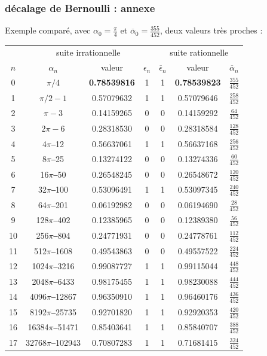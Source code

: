 \documentclass{beamer}
\begin{document}
\begin{frame}
\frametitle{décalage de Bernoulli : annexe}
Exemple comparé, avec  $\alpha_0 = \frac{\pi}{4}$   et   $\overline{\alpha}_0 = \frac{355}{452}$, deux valeurs très proches :
\begin{tabular}{|*{7}{c|}}
\
& \multicolumn{3}{|c|}{suite irrationnelle} 
& \multicolumn{3}{|c|}{suite rationnelle} \\
$n$ & $\alpha_n$ & valeur & $\epsilon_n$ & $\overline{\epsilon}_n$ & valeur & $\overline{\alpha}_n$ \\ 
\hline
0 & $\pi/4$ & \textbf{0.78539816} & 1 & 1 & \textbf{0.78539823} & $\frac{355}{452}$ \\
1 & $\pi/2-1$ & 0.57079632 & 1 & 1 & 0.57079646 & $\frac{258}{452}$ \\
2 & $\pi-3$ & 0.14159265 & 0 & 0 & 0.14159292 & $\frac{64}{452}$ \\
3 & $2\pi-6$ & 0.28318530 & 0 & 0 & 0.28318584 & $\frac{128}{452}$ \\
4 & 4$\pi$‒12 & 0.56637061 & 1 & 1 & 0.56637168 & $\frac{256}{452}$ \\
5 & 8$\pi$‒25 & 0.13274122 & 0 & 0 & 0.13274336 & $\frac{60}{452}$ \\
6 & 16$\pi$‒50 & 0.26548245 & 0 & 0 & 0.26548672 & $\frac{120}{452}$ \\
7 & 32$\pi$‒100 & 0.53096491 & 1 & 1 & 0.53097345 & $\frac{240}{452}$ \\
8 & 64$\pi$‒201 & 0.06192982 & 0 & 0 & 0.06194690 & $\frac{28}{452}$ \\
9 & 128$\pi$‒402 & 0.12385965 & 0 & 0 & 0.12389380 & $\frac{56}{452}$ \\
10 & 256$\pi$‒804 & 0.24771931 & 0 & 0 & 0.24778761 & $\frac{112}{452}$ \\
11 & 512$\pi$‒1608 & 0.49543863 & 0 & 0 & 0.49557522 & $\frac{224}{452}$ \\
12 & 1024$\pi$‒3216 & 0.99087727 & 1 & 1 & 0.99115044 & $\frac{448}{452}$ \\
13 & 2048$\pi$‒6433 & 0.98175455 & 1 & 1 & 0.98230088 & $\frac{444}{452}$ \\
14 & 4096$\pi$‒12867 & 0.96350910 & 1 & 1 & 0.96460176 & $\frac{436}{452}$ \\
15 & 8192$\pi$‒25735 & 0.92701820 & 1 & 1 & 0.92920353 & $\frac{420}{452}$ \\
16 & 16384$\pi$‒51471 & 0.85403641 & 1 & 1 & 0.85840707 & $\frac{388}{452}$ \\
17 & 32768$\pi$‒102943 & 0.70807283 & 1 & 1 & 0.71681415 & $\frac{324}{452}$ \\

\end{tabular}
\end{frame}
\end{document}
